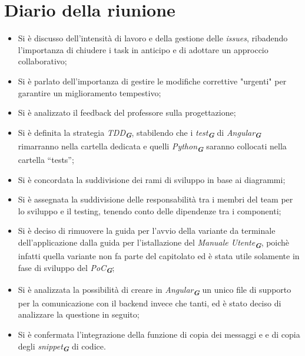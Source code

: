 
\section{Diario della riunione}

\begin{itemize}
    \item Si è discusso dell’intensità di lavoro e della gestione delle \emph{issues}, ribadendo l’importanza di chiudere i task in anticipo e di adottare un approccio collaborativo;  
    \item Si è parlato dell’importanza di gestire le modifiche correttive "urgenti" per garantire un miglioramento tempestivo;  
    \item Si è analizzato il feedback del professore sulla progettazione;  
    \item Si è definita la strategia \emph{TDD}\textsubscript{\textit{\textbf{G}}}, stabilendo che i \emph{test}\textsubscript{\textit{\textbf{G}}} di \emph{Angular}\textsubscript{\textit{\textbf{G}}} rimarranno nella cartella dedicata e quelli \emph{Python}\textsubscript{\textit{\textbf{G}}} saranno collocati nella cartella “tests”;
    \item Si è concordata la suddivisione dei rami di sviluppo in base ai diagrammi;  
    \item Si è assegnata la suddivisione delle responsabilità tra i membri del team per lo sviluppo e il testing, tenendo conto delle dipendenze tra i componenti;  
    \item Si è deciso di rimuovere la guida per l'avvio della variante da terminale dell'applicazione dalla guida per l'istallazione del \emph{Manuale Utente}\textsubscript{\textit{\textbf{G}}}, poichè infatti quella variante non fa parte del capitolato ed è stata utile solamente in fase di sviluppo del \emph{PoC}\textsubscript{\textit{\textbf{G}}};
    \item Si è analizzata la possibilità di creare in \emph{Angular}\textsubscript{\textit{\textbf{G}}} un unico file di supporto per la comunicazione con il backend invece che tanti, ed è stato deciso di analizzare la questione in seguito;
    \item Si è confermata l’integrazione della funzione di copia dei messaggi e e di copia degli \emph{snippet}\textsubscript{\textit{\textbf{G}}} di codice.
\end{itemize}


